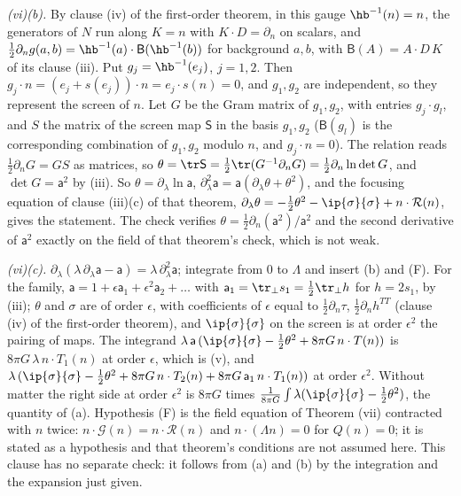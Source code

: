 \emph{(vi)(b).} By clause (iv) of the first-order theorem, in this gauge $\hb^{-1}(n) = n$, the generators of $N$ run along $K = n$ with $K \cdot D = \partial_{n}$ on scalars, and $\tfrac12\partial_{n}g(a, b) = \hb^{-1}(a) \cdot \mathsf{B}(\hb^{-1}(b))$ for background $a, b$, with $\mathsf{B}(A) = A \cdot D\,K$ of its clause (iii). Put $g_{j} = \hb^{-1}(e_{j})$, $j = 1, 2$. Then $g_{j} \cdot n = (e_{j} + s(e_{j})) \cdot n = e_{j} \cdot s(n) = 0$, and $g_{1}, g_{2}$ are independent, so they represent the screen of $n$. Let $G$ be the Gram matrix of $g_{1}, g_{2}$, with entries $g_{j} \cdot g_{l}$, and $S$ the matrix of the screen map $\mathsf{S}$ in the basis $g_{1}, g_{2}$ ($\mathsf{B}(g_{l})$ is the corresponding combination of $g_{1}, g_{2}$ modulo $n$, and $g_{j} \cdot n = 0$). The relation reads $\tfrac12\partial_{n}G = GS$ as matrices, so $\theta = \tr\mathsf{S} = \tfrac12\tr(G^{-1}\partial_{n}G) = \tfrac12\partial_{n}\ln\det G$, and $\det G = \mathsf{a}^{2}$ by (iii). So $\theta = \partial_{\lambda}\ln\mathsf{a}$, $\partial_{\lambda}^{2}\mathsf{a} = \mathsf{a}(\partial_{\lambda}\theta + \theta^{2})$, and the focusing equation of clause (iii)(c) of that theorem, $\partial_{\lambda}\theta = -\tfrac12\theta^{2} - \ip{\sigma}{\sigma} + n \cdot \mathcal{R}(n)$, gives the statement. The check verifies $\theta = \tfrac12\partial_{n}(\mathsf{a}^{2})/\mathsf{a}^{2}$ and the second derivative of $\mathsf{a}^{2}$ exactly on the field of that theorem's check, which is not weak.

\emph{(vi)(c).} $\partial_{\lambda}(\lambda\,\partial_{\lambda}\mathsf{a} - \mathsf{a}) = \lambda\,\partial_{\lambda}^{2}\mathsf{a}$; integrate from $0$ to $\Lambda$ and insert (b) and (F). For the family, $\mathsf{a} = 1 + \epsilon\mathsf{a}_{1} + \epsilon^{2}\mathsf{a}_{2} + \dots$ with $\mathsf{a}_{1} = \tr_{\perp}s_{1} = \tfrac12\tr_{\perp}h$ for $h = 2s_{1}$, by (iii); $\theta$ and $\sigma$ are of order $\epsilon$, with coefficients of $\epsilon$ equal to $\tfrac12\partial_{n}\tau$, $\tfrac12\partial_{n}h^{TT}$ (clause (iv) of the first-order theorem), and $\ip{\sigma}{\sigma}$ on the screen is at order $\epsilon^{2}$ the pairing of maps. The integrand $\lambda\,\mathsf{a}\,(\ip{\sigma}{\sigma} - \tfrac12\theta^{2} + 8\pi G\,n \cdot T(n))$ is $8\pi G\,\lambda\,n \cdot T_{1}(n)$ at order $\epsilon$, which is (v), and $\lambda\,(\ip{\sigma}{\sigma} - \tfrac12\theta^{2} + 8\pi G\,n \cdot T_{2}(n) + 8\pi G\,\mathsf{a}_{1}\,n \cdot T_{1}(n))$ at order $\epsilon^{2}$. Without matter the right side at order $\epsilon^{2}$ is $8\pi G$ times $\tfrac{1}{8\pi G}\int\lambda(\ip{\sigma}{\sigma} - \tfrac12\theta^{2})$, the quantity of (a). Hypothesis (F) is the field equation of Theorem (vii) contracted with $n$ twice: $n \cdot \mathcal{G}(n) = n \cdot \mathcal{R}(n)$ and $n \cdot (\Lambda n) = 0$ for $Q(n) = 0$; it is stated as a hypothesis and that theorem's conditions are not assumed here. This clause has no separate check: it follows from (a) and (b) by the integration and the expansion just given.

